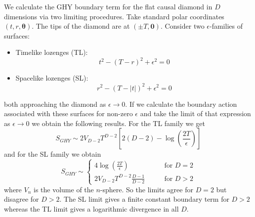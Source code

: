 \documentclass{article}
\begin{document}
We calculate the GHY boundary term for the flat causal diamond in $D$ dimensions via two limiting procedures. Take standard polar coordinates $(t,r,\boldsymbol\theta)$. The tips of the diamond are at $(\pm T,\mathbf0)$. Consider two $\epsilon$-families of surfaces:
\begin{itemize}
\item Timelike lozenges (TL): 	$$t^2 - (T-r)^2 + \epsilon^2 = 0$$
\item Spacelike lozenges  (SL):	$$r^2 - (T-|t|)^2 + \epsilon^2  = 0$$
\end{itemize}
both approaching the diamond as $\epsilon\rightarrow0$. If we calculate the boundary action associated with these surfaces for non-zero $\epsilon$ and take the limit of that expression as $\epsilon\rightarrow0$ we obtain the following results. For the TL family we get
$$
S_{GHY} \sim2 V_{D-2}T^{D-2}\left[2(D-2)-\log\left(\frac{2T}{\epsilon}\right)\right]
$$
and for the SL family we obtain
$$
S_{GHY} \sim
\begin{cases}
\displaystyle4\log\left(\frac{2T}{\epsilon}\right) \qquad&\text{for }D=2\\
\displaystyle2 V_{D-2}T^{D-2}\frac{D-1}{D-2}\qquad&\text{for }D>2
\end{cases}
$$
where $V_n$ is the volume of the $n$-sphere. So the limits agree for $D=2$ but disagree for $D>2$.  The SL limit gives a finite constant boundary term for $D>2$ whereas the TL limit gives a logarithmic divergence in all $D$.
\end{document}
